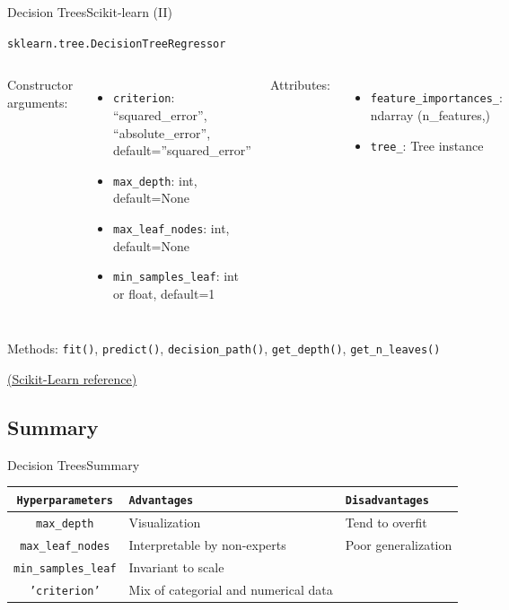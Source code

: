 \documentclass[10pt,compress]{beamer} %
\begin{document}
{\begin{frame}{Decision Trees}{Scikit-learn (II)}
\begin{exampleblock}{\texttt{sklearn.tree.DecisionTreeRegressor}}
         \begin{columns}[T]
                Constructor arguments:
                \begin{itemize}
                    \item \texttt{criterion}: {“squared\_error”, “absolute\_error”}, default=”squared\_error”
                    \item \texttt{max\_depth}: int, default=None
                    \item \texttt{max\_leaf\_nodes}: int, default=None
                    \item \texttt{min\_samples\_leaf}: int or float, default=1
                \end{itemize}

                Attributes:
                \begin{itemize}
                    \item \texttt{feature\_importances\_}: ndarray (n\_features,)
                    \item \texttt{tree\_}: Tree instance
                \end{itemize}
            \end{columns}

            \medskip

            Methods: \texttt{fit()}, \texttt{predict()}, \texttt{decision\_path()}, \texttt{get\_depth()}, \texttt{get\_n\_leaves()}
        \end{exampleblock}

        \medskip

        \centering \href{https://scikit-learn.org/stable/modules/generated/sklearn.tree.DecisionTreeRegressor.html}{(Scikit-Learn reference)}
    \end{frame}
}{}

\subsection{Summary}
\begin{frame}{Decision Trees}{Summary}
	\begin{center}
	\begin{tabular}{cp{3cm}p{3cm}}\hline
	 	\texttt{Hyperparameters}  & \texttt{Advantages}  & \texttt{Disadvantages} \\\hline
	 	\texttt{max\_depth}       & Visualization        & Tend to overfit  \\
	 	\texttt{max\_leaf\_nodes} & Interpretable by non-experts     & Poor generalization  \\
	 	\texttt{min\_samples\_leaf} & Invariant to scale     &   \\
	 	\texttt{'criterion'} & Mix of categorial and numerical data     &   \\
	 	\hline
	\end{tabular}
	\end{center}
\end{frame}
\end{document}
